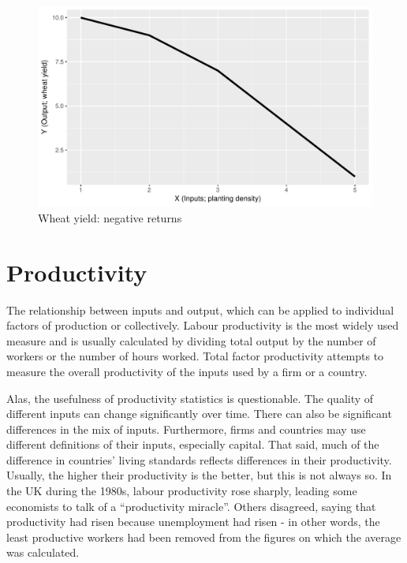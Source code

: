 \documentclass[11pt,]{book}
\theoremstyle{definition}
\theoremstyle{definition}
\theoremstyle{definition}
\theoremstyle{remark}
\begin{document}
\begin{figure}

{\centering \includegraphics[width=0.9\linewidth]{Farm_Management_and_Economics_files/figure-latex/negative-returns1-1} 

}

\caption{Wheat yield: negative returns}\label{fig:negative-returns1}
\end{figure}

\section{Productivity}\label{productivity}

The relationship between inputs and output, which can be applied to
individual factors of production or collectively. Labour productivity is
the most widely used measure and is usually calculated by dividing total
output by the number of workers or the number of hours worked. Total
factor productivity attempts to measure the overall productivity of the
inputs used by a firm or a country.

Alas, the usefulness of productivity statistics is questionable. The
quality of different inputs can change significantly over time. There
can also be significant differences in the mix of inputs. Furthermore,
firms and countries may use different definitions of their inputs,
especially capital. That said, much of the difference in countries'
living standards reflects differences in their productivity. Usually,
the higher their productivity is the better, but this is not always so.
In the UK during the 1980s, labour productivity rose sharply, leading
some economists to talk of a ``productivity miracle''. Others disagreed,
saying that productivity had risen because unemployment had risen - in
other words, the least productive workers had been removed from the
figures on which the average was calculated.
\end{document}
